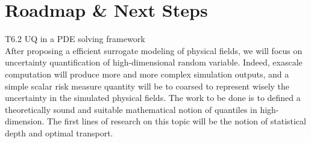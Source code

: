 \section{Roadmap \& Next Steps}

T6.2 UQ in a PDE solving framework \\ 
After proposing a efficient surrogate modeling of physical fields, we will focus on uncertainty quantification of high-dimensional random variable. Indeed, exascale computation will produce more and more complex simulation outputs, and a simple scalar risk measure quantity will be to coarsed to represent wisely the uncertainty in the simulated physical fields. The work to be done is to defined a theoretically sound and suitable mathematical notion of quantiles in high-dimension. The first lines of research on this topic will be the notion of statistical depth and optimal transport. 
